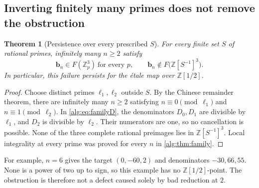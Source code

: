 \documentclass[11pt]{article}
\numberwithin{equation}{section}
\newtheorem{theorem}{Theorem}[section]
\theoremstyle{plain}
\theoremstyle{plain}
\theoremstyle{plain}
\theoremstyle{definition}
\theoremstyle{definition}
\theoremstyle{definition}
\theoremstyle{remark}
\newcommand{\Z}{\mathbb Z}\newcommand{\Q}{\mathbb Q}
\newcommand{\target}{\boldsymbol b}
\begin{document}
\subsection{Inverting finitely many primes does not remove the obstruction}
\begin{theorem}[Persistence over every prescribed $S$]\label{alg:thm:S}
For every finite set $S$ of rational primes, infinitely many $n\ge2$
satisfy
\[
 \target_n\in F(\Z_p^3)\ \text{for every }p,
 \qquad
 \target_n\notin F\bigl(\Z[S^{-1}]^3\bigr).
\]
In particular, this failure persists for the \'etale map over
$\Z[1/2]$.
\end{theorem}
\begin{proof}
Choose distinct primes $\ell_1,\ell_2$ outside $S$. By the Chinese
remainder theorem, there are infinitely many $n\ge2$ satisfying
$n\equiv0\pmod{\ell_1}$ and $n\equiv1\pmod{\ell_2}$.
In \eqref{alg:eq:familyD}, the denominators $D_0,D_1$ are divisible by
$\ell_1$, and $D_2$ is divisible by $\ell_2$. Their numerators are one,
so no cancellation is possible. None of the three complete rational
preimages lies in $\Z[S^{-1}]^3$. Local integrality at every prime was
proved for every $n$ in \cref{alg:thm:family}.
\end{proof}
For example, $n=6$ gives the target $(0,-60,2)$ and denominators
$-30,66,55$. None is a power of two up to sign, so this example has no
$\Z[1/2]$-point. The obstruction is therefore not a defect caused solely
by bad reduction at $2$.
\end{document}
